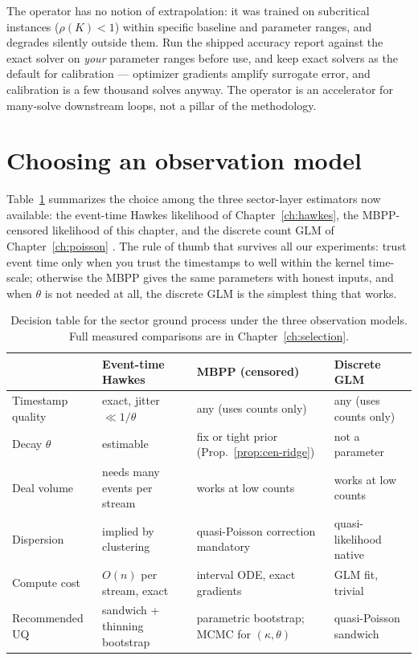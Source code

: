 \begin{warning}
\label{warn:cen-operator}
The operator has no notion of extrapolation: it was trained on subcritical instances
($\rho(K)<1$) within specific baseline and parameter ranges, and degrades silently
outside them. Run the shipped accuracy report against the exact solver on \emph{your}
parameter ranges before use, and keep exact solvers as the default for calibration ---
optimizer gradients amplify surrogate error, and calibration is a few thousand solves
anyway. The operator is an accelerator for many-solve downstream loops, not a pillar of
the methodology.
\end{warning}

\section{Choosing an observation model}
\label{sec:cen-decision}

Table~\ref{tab:cen-decision} summarizes the choice among the three sector-layer estimators
now available: the event-time Hawkes likelihood of Chapter~\ref{ch:hawkes}, the
MBPP-censored likelihood of this chapter, and the discrete count GLM of
Chapter~\ref{ch:poisson} \cite{fokianos2009}. The rule of thumb that survives all our
experiments: trust event time only when you trust the timestamps to well within the kernel
time-scale; otherwise the MBPP gives the same parameters with honest inputs, and when
$\theta$ is not needed at all, the discrete GLM is the simplest thing that works.

\begin{table}[htbp]
\centering
\small
\begin{tabular}{lp{3.1cm}p{3.4cm}p{3.1cm}}
\toprule
 & Event-time Hawkes & MBPP (censored) & Discrete GLM \\
\midrule
Timestamp quality & exact, jitter $\ll 1/\theta$ & any (uses counts only) & any (uses
counts only) \\
Decay $\theta$ & estimable & fix or tight prior (Prop.~\ref{prop:cen-ridge}) & not a
parameter \\
Deal volume & needs many events per stream & works at low counts & works at low counts \\
Dispersion & implied by clustering & quasi-Poisson correction mandatory & quasi-likelihood
native \\
Compute cost & $O(n)$ per stream, exact & interval ODE, exact gradients & GLM fit,
trivial \\
Recommended UQ & sandwich + thinning bootstrap & parametric bootstrap; MCMC for
$(\kappa,\theta)$ & quasi-Poisson sandwich \\
\bottomrule
\end{tabular}
\caption{Decision table for the sector ground process under the three observation models.
Full measured comparisons are in Chapter~\ref{ch:selection}.}
\label{tab:cen-decision}
\end{table}


